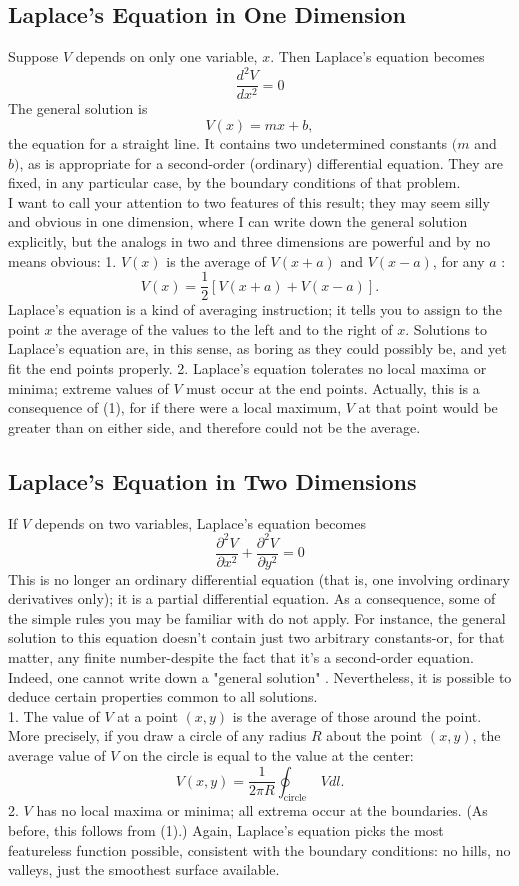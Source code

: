 \subsection{Laplace's Equation in One Dimension}
Suppose $V$ depends on only one variable, $x$. Then Laplace's equation becomes
$$
\frac{d^{2} V}{d x^{2}}=0
$$
The general solution is
$$
V(x)=m x+b,
$$
the equation for a straight line. It contains two undetermined constants $(m$ and $b)$, as is appropriate for a second-order (ordinary) differential equation. They are fixed, in any particular case, by the boundary conditions of that problem.\\
I want to call your attention to two features of this result; they may seem silly and obvious in one dimension, where I can write down the general solution explicitly, but the analogs in two and three dimensions are powerful and by no means obvious:
1. $V(x)$ is the average of $V(x+a)$ and $V(x-a)$, for any $a$ :
$$
V(x)=\frac{1}{2}[V(x+a)+V(x-a)] .
$$
Laplace's equation is a kind of averaging instruction; it tells you to assign to the point $x$ the average of the values to the left and to the right of $x$. Solutions to Laplace's equation are, in this sense, as boring as they could possibly be, and yet fit the end points properly.
2. Laplace's equation tolerates no local maxima or minima; extreme values of $V$ must occur at the end points. Actually, this is a consequence of (1), for if there were a local maximum, $V$ at that point would be greater than on either side, and therefore could not be the average.
\subsection{Laplace's Equation in Two Dimensions}
If $V$ depends on two variables, Laplace's equation becomes
$$
\frac{\partial^{2} V}{\partial x^{2}}+\frac{\partial^{2} V}{\partial y^{2}}=0
$$
This is no longer an ordinary differential equation (that is, one involving ordinary derivatives only); it is a partial differential equation. As a consequence, some of the simple rules you may be familiar with do not apply. For instance, the general solution to this equation doesn't contain just two arbitrary constants-or, for that matter, any finite number-despite the fact that it's a second-order equation. Indeed, one cannot write down a "general solution" . Nevertheless, it is possible to deduce certain properties common to all solutions.\\
1. The value of $V$ at a point $(x, y)$ is the average of those around the point. More precisely, if you draw a circle of any radius $R$ about the point $(x, y)$, the average value of $V$ on the circle is equal to the value at the center:
$$
V(x, y)=\frac{1}{2 \pi R} \oint_{\text {circle }} V d l .
$$
2. $V$ has no local maxima or minima; all extrema occur at the boundaries. (As before, this follows from (1).) Again, Laplace's equation picks the most featureless function possible, consistent with the boundary conditions: no hills, no valleys, just the smoothest surface available.
